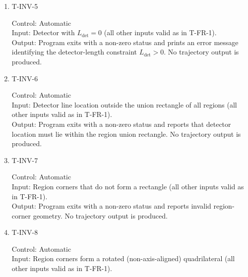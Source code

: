 \documentclass[12pt, titlepage]{article}
\begin{document}
\begin{enumerate}
Input: Detector orientation is \texttt{diagonal} (all other inputs valid as in
T-FR-1).\\

Output: Program exits with a non-zero status and prints an error message
identifying allowed detector orientations:
\texttt{horizontal} or \texttt{vertical}.  No trajectory output is produced.

\item{T-INV-5\\}

Control: Automatic\\

Input: Detector with $L_{\mathrm{det}} = 0$ (all other inputs valid as in
T-FR-1).\\

Output: Program exits with a non-zero status and prints an error message
identifying the detector-length constraint $L_{\mathrm{det}} > 0$.
No trajectory output is produced.

\item{T-INV-6\\}

Control: Automatic\\

Input: Detector line location outside the union rectangle of all regions
(all other inputs valid as in T-FR-1).\\

Output: Program exits with a non-zero status and reports that detector location
must lie within the region union rectangle. No trajectory output is produced.

\item{T-INV-7\\}

Control: Automatic\\

Input: Region corners that do not form a rectangle
(all other inputs valid as in T-FR-1).\\

Output: Program exits with a non-zero status and reports invalid region-corner
geometry. No trajectory output is produced.

\item{T-INV-8\\}

Control: Automatic\\

Input: Region corners form a rotated (non-axis-aligned) quadrilateral
(all other inputs valid as in T-FR-1).\\


\end{enumerate}
\end{document}
